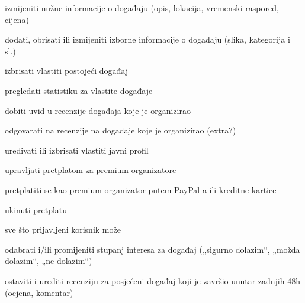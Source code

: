 \begin{packed_enum}
\begin{packed_enum}
\begin{packed_enum}
						\item izmijeniti nužne informacije o događaju (opis, lokacija, vremenski raspored, cijena)
						\item dodati, obrisati ili izmijeniti izborne informacije o događaju (slika, kategorija i sl.)
						
					\end{packed_enum}
					\item izbrisati vlastiti postojeći događaj
					\item pregledati statistiku za vlastite događaje
					\item dobiti uvid u recenzije događaja koje je organizirao
					\item odgovarati na recenzije na događaje koje je organizirao (extra?)
					\item uređivati ili izbrisati vlastiti javni profil
					\item upravljati pretplatom za premium organizatore
					\begin{packed_enum}
						
						\item pretplatiti se kao premium organizator putem PayPal-a ili kreditne kartice
						\item ukinuti pretplatu
						
					\end{packed_enum}
				
				\end{packed_enum}

				\item {}
				
				\begin{packed_enum}
					
					\item sve što prijavljeni korisnik može
					\item odabrati i/ili promijeniti stupanj interesa za događaj („sigurno dolazim“, „možda dolazim“, „ne dolazim“)
					\item ostaviti i urediti recenziju za posjećeni događaj koji je završio unutar zadnjih 48h (ocjena, komentar)
					
				\end{packed_enum}
			
				\item  {}
				
				\begin{packed_enum}
					

\end{packed_enum}
\end{packed_enum}
